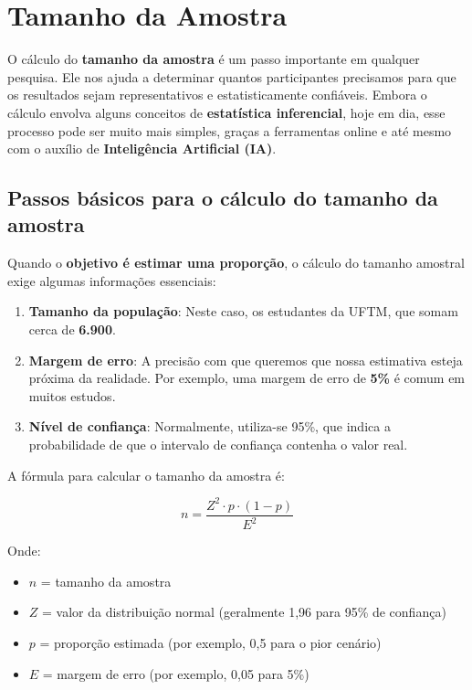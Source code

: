\documentclass[
]{book}
\providecommand{\tightlist}{%
  \setlength{\itemsep}{0pt}\setlength{\parskip}{0pt}}
\begin{document}
\chapter{Tamanho da Amostra}\label{tamanho-da-amostra}

O cálculo do \textbf{tamanho da amostra} é um passo importante em qualquer pesquisa. Ele nos ajuda a determinar quantos participantes precisamos para que os resultados sejam representativos e estatisticamente confiáveis. Embora o cálculo envolva alguns conceitos de \textbf{estatística inferencial}, hoje em dia, esse processo pode ser muito mais simples, graças a ferramentas online e até mesmo com o auxílio de \textbf{Inteligência Artificial (IA)}.

\section{Passos básicos para o cálculo do tamanho da amostra}\label{passos-buxe1sicos-para-o-cuxe1lculo-do-tamanho-da-amostra}

Quando o \textbf{objetivo é estimar uma proporção}, o cálculo do tamanho amostral exige algumas informações essenciais:

\begin{enumerate}
\def\labelenumi{\arabic{enumi}.}
\tightlist
\item
  \textbf{Tamanho da população}: Neste caso, os estudantes da UFTM, que somam cerca de \textbf{6.900}.
\item
  \textbf{Margem de erro}: A precisão com que queremos que nossa estimativa esteja próxima da realidade. Por exemplo, uma margem de erro de \textbf{5\%} é comum em muitos estudos.
\item
  \textbf{Nível de confiança}: Normalmente, utiliza-se 95\%, que indica a probabilidade de que o intervalo de confiança contenha o valor real.
\end{enumerate}

A fórmula para calcular o tamanho da amostra é:

\[
n = \frac{{Z^2 \cdot p \cdot (1 - p)}}{{E^2}}
\]

Onde:

\begin{itemize}
\tightlist
\item
  \(n\) = tamanho da amostra
\item
  \(Z\) = valor da distribuição normal (geralmente 1,96 para 95\% de confiança)
\item
  \(p\) = proporção estimada (por exemplo, 0,5 para o pior cenário)
\item
  \(E\) = margem de erro (por exemplo, 0,05 para 5\%)
\end{itemize}
\end{document}
